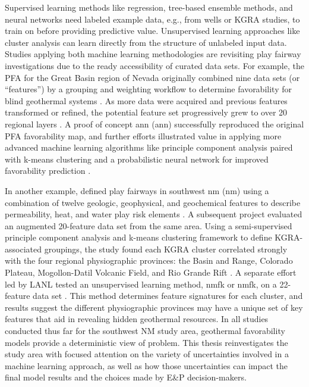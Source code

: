 Supervised learning methods like regression, tree-based ensemble methods, and neural networks need labeled example data, e.g., from wells or KGRA studies, to train on before providing predictive value. Unsupervised learning approaches like cluster analysis can learn directly from the structure of unlabeled input data. Studies applying both machine learning methodologies are revisiting play fairway investigations due to the ready accessibility of curated data sets. For example, the PFA for the Great Basin region of Nevada originally combined nine data sets (or “features”) by a grouping and weighting workflow to determine favorability for blind geothermal systems \citep{faulds_progress_2017}. As more data were acquired and previous features transformed or refined, the potential feature set progressively grew to over 20 regional layers \citep{brown_machine_2020, faulds_discovering_2019}. A proof of concept \acrlong{ann} (\acrshort{ann}) successfully reproduced the original PFA favorability map, and further efforts illustrated value in applying more advanced machine learning algorithms like principle component analysis paired with k-means clustering \citep{smith_characterizing_2021} and a probabilistic neural network for improved favorability prediction \citep{brown_machine_2020}.

In another example, \citeauthor{bielicki_hydrogeolgic_2015} defined play fairways in southwest \acrlong{nm} (\acrshort{nm}) using a combination of twelve geologic, geophysical, and geochemical features to describe permeability, heat, and water play risk elements \citeyear{bielicki_hydrogeolgic_2015}. A subsequent project evaluated an augmented 20-feature data set from the same area. Using a semi-supervised principle component analysis and k-means clustering framework to define KGRA-associated groupings, the study found each KGRA cluster correlated strongly with the four regional physiographic provinces: the Basin and Range, Colorado Plateau, Mogollon-Datil Volcanic Field, and Rio Grande Rift \citep{pepin_new_2018}. A separate effort led by LANL tested an unsupervised learning method, \acrlong{nmfk} or \acrshort{nmfk}, on a 22-feature data set \citep{vesselinov_discovering_2020}. This method determines feature signatures for each cluster, and results suggest the different physiographic provinces may have a unique set of key features that aid in revealing hidden geothermal resources. In all studies conducted thus far for the southwest NM study area, geothermal favorability models provide a deterministic view of problem. This thesis reinvestigates the study area with focused attention on the variety of uncertainties involved in a machine learning approach, as well as how those uncertainties can impact the final model results and the choices made by E\&P decision-makers.

